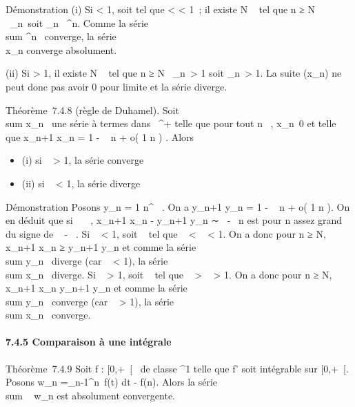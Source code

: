 \documentclass[]{article}
\begin{document}
Démonstration (i) Si \ell \textless{} 1, soit \rho tel que \ell \textless{} \rho
\textless{} 1~; il existe N \in {}~ tel que n ≥ N
\rigtharrow~\rootn\of\x_n\
\leq \rho soit
\x_n\ \leq
\rho^n. Comme la série
\\sum  \rho^n~
converge, la série \\\sum
 x_n converge absolument.

(ii) Si \ell \textgreater{} 1, il existe N \in {}~ tel que n ≥ N
\rigtharrow~\rootn\of\x_n\
\textgreater{} 1 soit
\x_n\
\textgreater{} 1. La suite (x_n) ne peut donc pas avoir 0 pour
limite et la série diverge.

Théorème~7.4.8 (règle de Duhamel). Soit
\\sum  x_n~ une
série à termes dans ~^+ telle que pour tout n \in {}~,
x_n\neq~0 et telle que  x_n+1
\over x_n = 1 - \lambda~ \over n +
o( 1 \over n ) . Alors

\begin{itemize}
\itemsep1pt\parskip0pt
\item
  (i) si \lambda~ \textgreater{} 1, la série converge
\item
  (ii) si \lambda~ \textless{} 1, la série diverge
\end{itemize}

Démonstration Posons y_n = 1 \over
n^\alpha~ . On a  y_n+1 \over
y_n = 1 - \alpha~ \over n + o( 1
\over n ). On en déduit que si
\alpha~\neq~\lambda~,  x_n+1 \over
x_n - y_n+1 \over y_n
∼ \alpha~-\lambda~ \over n est pour n assez grand du signe de \alpha~ -
\lambda~. Si \lambda~ \textless{} 1, soit \alpha~ tel que \lambda~ \textless{} \alpha~ \textless{} 1. On
a donc pour n ≥ N,  x_n+1 \over x_n
≥ y_n+1 \over y_n et comme la série
\\sum  y_n~
diverge (car \alpha~ \textless{} 1), la série
\\sum  x_n~
diverge. Si \lambda~ \textgreater{} 1, soit \alpha~ tel que \lambda~ \textgreater{} \alpha~
\textgreater{} 1. On a donc pour n ≥ N,  x_n+1
\over x_n \leq y_n+1
\over y_n et comme la série
\\sum  y_n~
converge (car \alpha~ \textgreater{} 1), la série
\\sum  x_n~
converge.

\paragraph{7.4.5 Comparaison à une intégrale}

Théorème~7.4.9 Soit f : {[}0,+\infty~{[}\rightarrow~  de classe ^1 telle que
f' soit intégrable sur {[}0,+\infty~{[}. Posons w_n
=\int  _n-1^n~f(t) dt - f(n).
Alors la série \\sum ~
w_n est absolument convergente.
\end{document}
